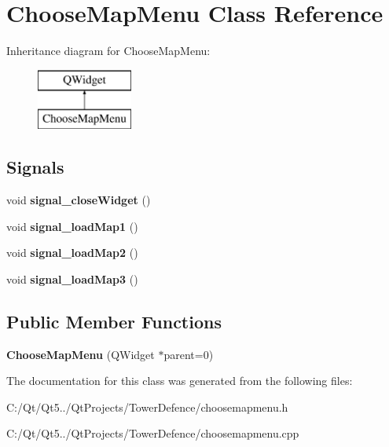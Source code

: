 \hypertarget{class_choose_map_menu}{}\section{Choose\+Map\+Menu Class Reference}
\label{class_choose_map_menu}
Inheritance diagram for Choose\+Map\+Menu\+:\begin{figure}[H]
\begin{center}
\leavevmode
\includegraphics[height=2.000000cm]{class_choose_map_menu}
\end{center}
\end{figure}
\subsection*{Signals}
\begin{DoxyCompactItemize}
\item 
\hypertarget{class_choose_map_menu_a52fd9fcbe8d0938c2e890955f6ae3b16}{}void {\bfseries signal\+\_\+close\+Widget} ()\label{class_choose_map_menu_a52fd9fcbe8d0938c2e890955f6ae3b16}

\item 
\hypertarget{class_choose_map_menu_ac07607f22a833eea56a702919e252726}{}void {\bfseries signal\+\_\+load\+Map1} ()\label{class_choose_map_menu_ac07607f22a833eea56a702919e252726}

\item 
\hypertarget{class_choose_map_menu_a1381ec145faea303bccb1c70a68e3cc4}{}void {\bfseries signal\+\_\+load\+Map2} ()\label{class_choose_map_menu_a1381ec145faea303bccb1c70a68e3cc4}

\item 
\hypertarget{class_choose_map_menu_aeaa2dab02f633327603dccff5bbe2c05}{}void {\bfseries signal\+\_\+load\+Map3} ()\label{class_choose_map_menu_aeaa2dab02f633327603dccff5bbe2c05}

\end{DoxyCompactItemize}
\subsection*{Public Member Functions}
\begin{DoxyCompactItemize}
\item 
\hypertarget{class_choose_map_menu_a26281993cdd19197bec03e11b59535cd}{}{\bfseries Choose\+Map\+Menu} (Q\+Widget $\ast$parent=0)\label{class_choose_map_menu_a26281993cdd19197bec03e11b59535cd}

\end{DoxyCompactItemize}


The documentation for this class was generated from the following files\+:\begin{DoxyCompactItemize}
\item 
C\+:/\+Qt/\+Qt5../\+Qt\+Projects/\+Tower\+Defence/choosemapmenu.\+h\item 
C\+:/\+Qt/\+Qt5../\+Qt\+Projects/\+Tower\+Defence/choosemapmenu.\+cpp\end{DoxyCompactItemize}
